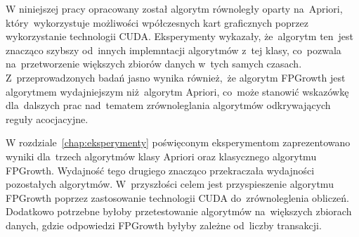 W niniejszej pracy opracowany został algorytm równoległy oparty na~Apriori, który~wykorzystuje możliwości wpółczesnych kart graficznych poprzez wykorzystanie technologii CUDA. Eksperymenty wykazały, że~algorytm ten~jest znacząco szybszy od~innych implemntacji algorytmów z~tej klasy, co~pozwala na~przetworzenie większych zbiorów danych w~tych samych czasach. Z~przeprowadzonych badań jasno wynika również,~że algorytm FPGrowth jest algorytmem wydajniejszym niż~algorytm Apriori, co~może stanowić wskazówkę dla~dalszych prac nad~tematem zrównoleglania algorytmów odkrywających reguły acocjacyjne.

W rozdziale~\ref{chap:eksperymenty} poświęconym eksperymentom zaprezentowano wyniki dla~trzech algorytmów klasy Apriori oraz klasycznego algorytmu FPGrowth. Wydajność tego drugiego znacząco przekraczała wydajności pozostałych algorytmów. W~przyszłości celem jest przyspieszenie algorytmu FPGrowth poprzez zastosowanie technologii CUDA do~zrównoleglenia obliczeń. Dodatkowo potrzebne byłoby przetestowanie algorytmów na~większych zbiorach danych, gdzie odpowiedzi FPGrowth byłyby zależne od~liczby transakcji.